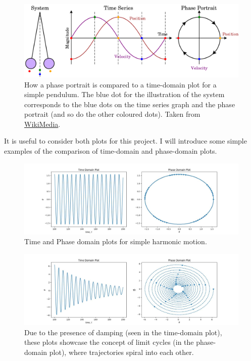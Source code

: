 \documentclass[10pt, twocolumn]{article}
\begin{document}
\begin{figure}[H]
    \centering  
    \includegraphics[width = \columnwidth]{Projects/ForcedSimplePendulum/WrittenReport/figs/Pendulum_phase_portrait_illustration.svg.png}
    \caption{How a phase portrait is compared to a time-domain plot for a simple pendulum. The blue dot for the illustration of the system corresponds to the blue dots on the time series graph and the phase portrait (and so do the other coloured dots). Taken from \hyperlink{https://commons.wikimedia.org/wiki/File:Pendulum_phase_portrait_illustration.svg}{WikiMedia}.}
    \label{fig:enter-label}
\end{figure}
 It is useful to consider both plots for this project. I will introduce some simple examples of the comparison of time-domain and phase-domain plots.
 \begin{figure}
     \centering
     \includegraphics{Projects/ForcedSimplePendulum/Plots/demo_simple_harmonic_motion.jpg}
     \caption{Time and Phase domain plots for simple harmonic motion.}
     \label{fig:enter-label}
 \end{figure}

 \begin{figure}
     \centering
     \includegraphics{Projects/ForcedSimplePendulum/Plots/demo_limit_cycles.jpg}
     \caption{Due to the presence of damping (seen in the time-domain plot), these plots showcase the concept of limit cycles (in the phase-domain plot), where trajectories spiral into each other.}
     \label{fig:enter-label}
 \end{figure}
\end{document}
